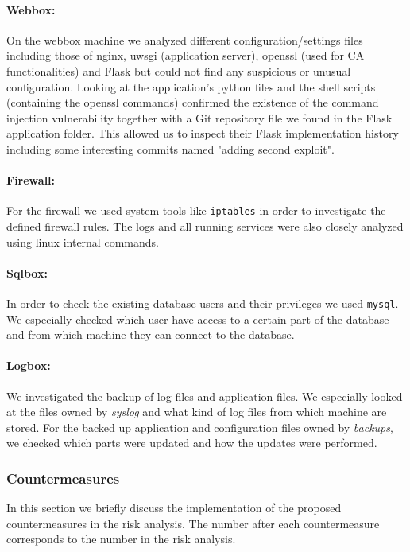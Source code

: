 \documentclass[english]{article}
\newcommand{\code}[1]{\texttt{#1}}
\begin{document}
\paragraph{Webbox:} On the webbox machine we analyzed different configuration/settings files including those of nginx, uwsgi (application server), openssl (used for CA functionalities) and Flask but could not find any suspicious or unusual configuration. Looking at the application's python files and the shell scripts (containing the openssl commands) confirmed the existence of the command injection vulnerability together with a Git repository file  we found in the Flask application folder. This allowed us to inspect their Flask implementation history including some interesting commits named "adding second exploit".
\paragraph{Firewall:} For the firewall we used system tools like \code{iptables} in order to investigate the defined firewall rules. The logs and all running services were also closely analyzed using linux internal commands.  

\paragraph{Sqlbox:} In order to check the existing database users and their privileges we used \code{mysql}. We especially checked which user have access to a certain part of the database and from which machine they can connect to the database.

\paragraph{Logbox:} We investigated the backup of log files and application files. We especially looked at the files owned by \textit{syslog} and what kind of log files from which machine are stored. For the backed up application and configuration files owned by \textit{backups}, we checked which parts were updated and how the updates were performed.


\subsubsection{Countermeasures}
In this section we briefly discuss the implementation of the proposed countermeasures in the risk analysis. The number after each countermeasure corresponds to the number in the risk analysis.
\end{document}
